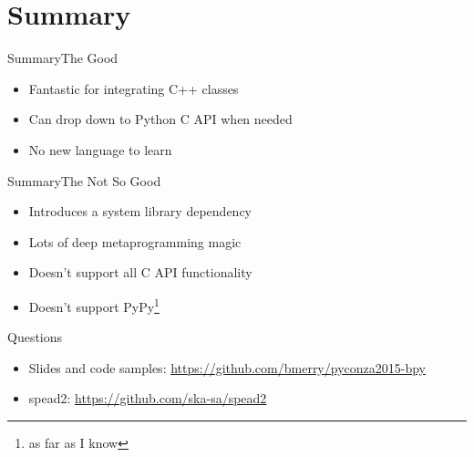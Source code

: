 \documentclass{beamer}
\begin{document}
\section*{Summary}

\begin{frame}[<+->]{Summary}{The Good}
  \begin{itemize}
    \item Fantastic for integrating C++ classes
    \item Can drop down to Python C API when needed
    \item No new language to learn
  \end{itemize}
\end{frame}

\begin{frame}[<+->]{Summary}{The Not So Good}
  \begin{itemize}
    \item Introduces a system library dependency
    \item Lots of deep metaprogramming magic
    \item Doesn't support all C API functionality
    \item Doesn't support PyPy\footnote{as far as I know}
  \end{itemize}
\end{frame}

\begin{frame}{Questions}
  \begin{itemize}
    \item Slides and code samples: \url{https://github.com/bmerry/pyconza2015-bpy}
    \item spead2: \url{https://github.com/ska-sa/spead2}
  \end{itemize}
\end{frame}
\end{document}
